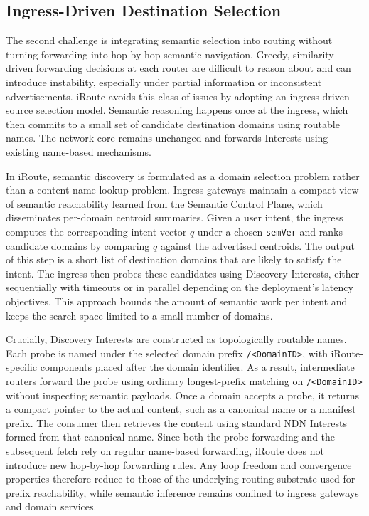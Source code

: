 \documentclass[journal]{IEEEtran}
\newcommand{\sysname}{iRoute}
\begin{document}
\subsection{Ingress-Driven Destination Selection}
\label{sec:design_forwarding}

The second challenge is integrating semantic selection into routing without turning forwarding into hop-by-hop semantic navigation. Greedy, similarity-driven forwarding decisions at each router are difficult to reason about and can introduce instability, especially under partial information or inconsistent advertisements. \sysname{} avoids this class of issues by adopting an ingress-driven source selection model. Semantic reasoning happens once at the ingress, which then commits to a small set of candidate destination domains using routable names.
The network core remains unchanged and forwards Interests using existing name-based mechanisms.

In \sysname{}, semantic discovery is formulated as a domain selection problem rather than a content name lookup problem. Ingress gateways maintain a compact view of semantic reachability learned from the Semantic Control Plane, which disseminates per-domain centroid summaries. Given a user intent, the ingress computes the corresponding intent vector $q$ under a chosen \texttt{semVer} and ranks candidate domains by comparing $q$ against the advertised centroids. The output of this step is a short list of destination domains that are likely to satisfy the intent. The ingress then probes these candidates using Discovery Interests, either sequentially with timeouts or in parallel depending on the deployment's latency objectives. This approach bounds the amount of semantic work per intent and keeps the search space limited to a small number of domains.

Crucially, Discovery Interests are constructed as topologically routable names.
Each probe is named under the selected domain prefix \texttt{/<DomainID>}, with \sysname{}-specific components placed after the domain identifier. As a result, intermediate routers forward the probe using ordinary longest-prefix matching on \texttt{/<DomainID>} without inspecting semantic payloads. Once a domain accepts a probe, it returns a compact pointer to the actual content, such as a canonical name or a manifest prefix. The consumer then retrieves the content using standard NDN Interests formed from that canonical name. Since both the probe forwarding and the subsequent fetch rely on regular name-based forwarding, \sysname{} does not introduce new hop-by-hop forwarding rules. Any loop freedom and convergence properties therefore reduce to those of the underlying routing substrate used for prefix reachability, while semantic inference remains confined to ingress gateways and domain services.
\end{document}
